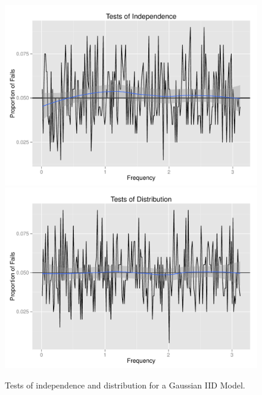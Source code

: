 \documentclass{article}\usepackage{graphicx, color}
\newenvironment{knitrout}{}{} %
\theoremstyle{plain}
\begin{document}
\begin{knitrout}
\color{fgcolor}\begin{figure}[H]

\includegraphics[width=.49\textwidth]{figure/tests-iid1} 
\includegraphics[width=.49\textwidth]{figure/tests-iid2} \caption[Tests of independence and distribution for a Gaussian IID Model]{Tests of independence and distribution for a Gaussian IID Model.\label{fig:tests-iid}}
\end{figure}


\end{knitrout}
\end{document}
